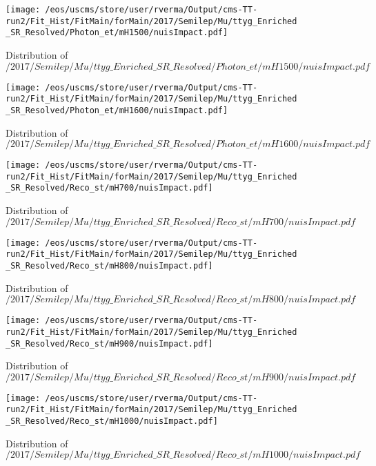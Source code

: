 \begin{figure}
\centering
\texttt{[image: /eos/uscms/store/user/rverma/Output/cms-TT-run2/Fit\_Hist/FitMain/forMain/2017/Semilep/Mu/ttyg\_Enriched\_SR\_Resolved/Photon\_et/mH1500/nuisImpact.pdf]}
\caption{Distribution of $/2017/Semilep/Mu/ttyg\_Enriched\_SR\_Resolved/Photon\_et/mH1500/nuisImpact.pdf$}
\end{figure}

\begin{figure}
\centering
\texttt{[image: /eos/uscms/store/user/rverma/Output/cms-TT-run2/Fit\_Hist/FitMain/forMain/2017/Semilep/Mu/ttyg\_Enriched\_SR\_Resolved/Photon\_et/mH1600/nuisImpact.pdf]}
\caption{Distribution of $/2017/Semilep/Mu/ttyg\_Enriched\_SR\_Resolved/Photon\_et/mH1600/nuisImpact.pdf$}
\end{figure}

\begin{figure}
\centering
\texttt{[image: /eos/uscms/store/user/rverma/Output/cms-TT-run2/Fit\_Hist/FitMain/forMain/2017/Semilep/Mu/ttyg\_Enriched\_SR\_Resolved/Reco\_st/mH700/nuisImpact.pdf]}
\caption{Distribution of $/2017/Semilep/Mu/ttyg\_Enriched\_SR\_Resolved/Reco\_st/mH700/nuisImpact.pdf$}
\end{figure}

\begin{figure}
\centering
\texttt{[image: /eos/uscms/store/user/rverma/Output/cms-TT-run2/Fit\_Hist/FitMain/forMain/2017/Semilep/Mu/ttyg\_Enriched\_SR\_Resolved/Reco\_st/mH800/nuisImpact.pdf]}
\caption{Distribution of $/2017/Semilep/Mu/ttyg\_Enriched\_SR\_Resolved/Reco\_st/mH800/nuisImpact.pdf$}
\end{figure}

\begin{figure}
\centering
\texttt{[image: /eos/uscms/store/user/rverma/Output/cms-TT-run2/Fit\_Hist/FitMain/forMain/2017/Semilep/Mu/ttyg\_Enriched\_SR\_Resolved/Reco\_st/mH900/nuisImpact.pdf]}
\caption{Distribution of $/2017/Semilep/Mu/ttyg\_Enriched\_SR\_Resolved/Reco\_st/mH900/nuisImpact.pdf$}
\end{figure}

\begin{figure}
\centering
\texttt{[image: /eos/uscms/store/user/rverma/Output/cms-TT-run2/Fit\_Hist/FitMain/forMain/2017/Semilep/Mu/ttyg\_Enriched\_SR\_Resolved/Reco\_st/mH1000/nuisImpact.pdf]}
\caption{Distribution of $/2017/Semilep/Mu/ttyg\_Enriched\_SR\_Resolved/Reco\_st/mH1000/nuisImpact.pdf$}
\end{figure}

